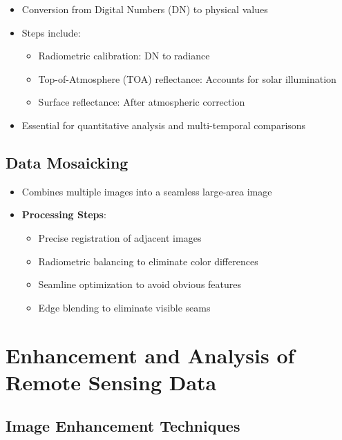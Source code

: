 \documentclass[
  letterpaper,
]{scrbook}
\providecommand{\tightlist}{%
  \setlength{\itemsep}{0pt}\setlength{\parskip}{0pt}}\usepackage{longtable,booktabs,array}
\begin{document}
\begin{itemize}
\tightlist
\item
  Conversion from Digital Numbers (DN) to physical values
\item
  Steps include:

  \begin{itemize}
  \tightlist
  \item
    Radiometric calibration: DN to radiance
  \item
    Top-of-Atmosphere (TOA) reflectance: Accounts for solar illumination
  \item
    Surface reflectance: After atmospheric correction
  \end{itemize}
\item
  Essential for quantitative analysis and multi-temporal comparisons
\end{itemize}

\subsection{Data Mosaicking}\label{data-mosaicking}

\begin{itemize}
\tightlist
\item
  Combines multiple images into a seamless large-area image
\item
  \textbf{Processing Steps}:

  \begin{itemize}
  \tightlist
  \item
    Precise registration of adjacent images
  \item
    Radiometric balancing to eliminate color differences
  \item
    Seamline optimization to avoid obvious features
  \item
    Edge blending to eliminate visible seams
  \end{itemize}
\end{itemize}

\section{Enhancement and Analysis of Remote Sensing
Data}\label{enhancement-and-analysis-of-remote-sensing-data}

\subsection{Image Enhancement
Techniques}\label{image-enhancement-techniques}
\end{document}
